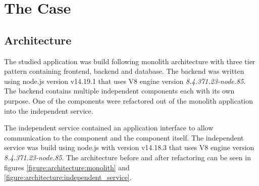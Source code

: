 \chapter{The Case\label{case}}

\section{Architecture}
The studied application was build following monolith architecture with three tier pattern containing frontend, backend and database.
The backend was written using node.js version v14.19.1 that uses V8 engine version \textit{8.4.371.23-node.85}.
The backend contains multiple independent components each with its own purpose.
One of the components were refactored out of the monolith application into the independent service.

The independent service contained an application interface to allow communication to the component and the component itself.
The independent service was build using node.js with version v14.18.3 that uses V8 engine version \textit{8.4.371.23-node.85}.
The architecture before and after refactoring can be seen in figures \ref{figure:architecture:monolith} and \ref{figure:architecture:independent_service}.

